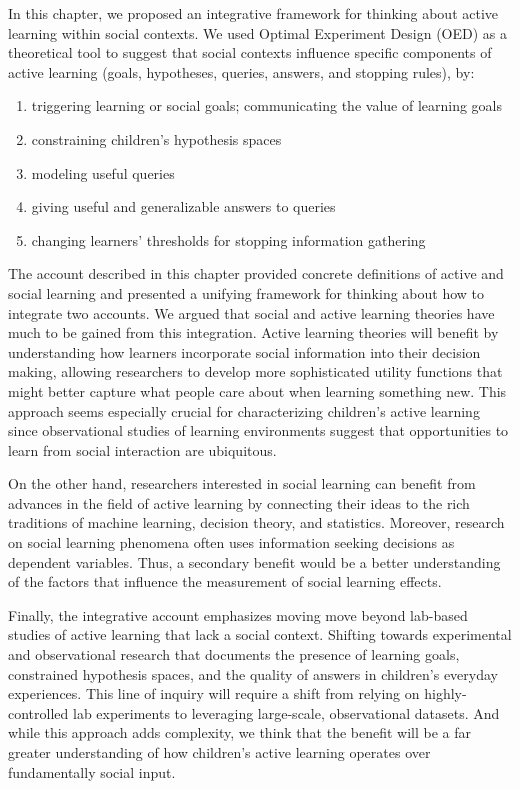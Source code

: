 \documentclass[oneside]{report}
\begin{document}
In this chapter, we proposed an integrative framework for thinking about
active learning within social contexts. We used Optimal Experiment
Design (OED) as a theoretical tool to suggest that social contexts
influence specific components of active learning (goals, hypotheses,
queries, answers, and stopping rules), by:
\begin{enumerate}
\def\labelenumi{\arabic{enumi}.}
\tightlist
\item
  triggering learning or social goals; communicating the value of
  learning goals
\item
  constraining children's hypothesis spaces
\item
  modeling useful queries
\item
  giving useful and generalizable answers to queries
\item
  changing learners' thresholds for stopping information gathering
\end{enumerate}
\noindent
The account described in this chapter provided concrete definitions of
active and social learning and presented a unifying framework for
thinking about how to integrate two accounts. We argued that social and
active learning theories have much to be gained from this integration.
Active learning theories will benefit by understanding how learners
incorporate social information into their decision making, allowing
researchers to develop more sophisticated utility functions that might
better capture what people care about when learning something new. This
approach seems especially crucial for characterizing children's active
learning since observational studies of learning environments suggest
that opportunities to learn from social interaction are ubiquitous.

On the other hand, researchers interested in social learning can benefit
from advances in the field of active learning by connecting their ideas
to the rich traditions of machine learning, decision theory, and
statistics. Moreover, research on social learning phenomena often uses
information seeking decisions as dependent variables. Thus, a secondary
benefit would be a better understanding of the factors that influence
the measurement of social learning effects.

Finally, the integrative account emphasizes moving move beyond lab-based
studies of active learning that lack a social context. Shifting towards
experimental and observational research that documents the presence of
learning goals, constrained hypothesis spaces, and the quality of
answers in children's everyday experiences. This line of inquiry will
require a shift from relying on highly-controlled lab experiments to
leveraging large-scale, observational datasets. And while this approach
adds complexity, we think that the benefit will be a far greater
understanding of how children's active learning operates over
fundamentally social input.
\end{document}
